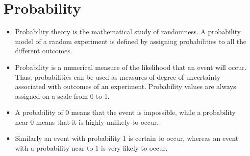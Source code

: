 

\section{Probability}
\begin{itemize}
\item Probability theory is the mathematical study of randomness. A
probability model of a random experiment is defined by assigning
probabilities to all the different outcomes.
\item Probability is a numerical measure of the likelihood that an event will
occur. Thus, probabilities can be used as measures of degree of
uncertainty associated with outcomes of an experiment.
Probability values are always assigned on a scale from 0 to 1.
\item A probability of 0 means that the event is impossible, while
a probability near 0 means that it is highly unlikely to occur.
\item Similarly an event with probability 1 is certain to occur, whereas an
event with a probability near to 1 is very likely to occur.
\end{itemize}

